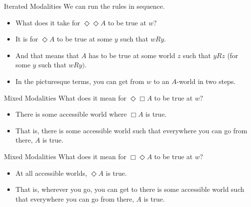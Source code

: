 \documentclass[
  14pt,
  letterpaper,
  ignorenonframetext,
  aspectratio=169,
]{beamer}
\providecommand{\tightlist}{%
  \setlength{\itemsep}{0pt}\setlength{\parskip}{0pt}}\usepackage{longtable,booktabs,array}
\begin{document}
\begin{frame}{Iterated Modalities}
\protect\hypertarget{iterated-modalities-1}{}
We can run the rules in sequence.

\begin{itemize}[<+->]
\tightlist
\item
  What does it take for \(\Diamond \Diamond A\) to be true at \(w\)?
\item
  It is for \(\Diamond A\) to be true at some \(y\) such that \(wRy\).
\item
  And that means that \(A\) has to be true at some world \(z\) such that
  \(yRz\) (for some \(y\) such that \(wRy)\).
\item
  In the picturesque terms, you can get from \(w\) to an \(A\)-world in
  two steps.
\end{itemize}
\end{frame}

\begin{frame}{Mixed Modalities}
\protect\hypertarget{mixed-modalities}{}
What does it mean for \(\Diamond \Box A\) to be true at \(w\)?

\begin{itemize}[<+->]
\tightlist
\item
  There is some accessible world where \(\Box A\) is true.
\item
  That is, there is some accessible world such that everywhere you can
  go from there, \(A\) is true.
\end{itemize}
\end{frame}

\begin{frame}{Mixed Modalities}
\protect\hypertarget{mixed-modalities-1}{}
What does it mean for \(\Box \Diamond A\) to be true at \(w\)?

\begin{itemize}[<+->]
\tightlist
\item
  At all accessible worlds, \(\Diamond A\) is true.
\item
  That is, wherever you go, you can get to there is some accessible
  world such that everywhere you can go from there, \(A\) is true.
\end{itemize}
\end{frame}
\end{document}
